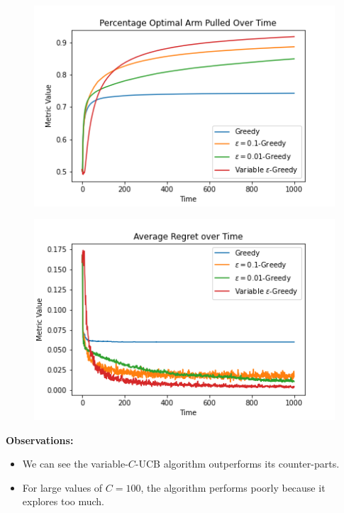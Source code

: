 \documentclass{article}
\begin{document}
		\begin{figure}[H]
		\graphicspath{ {../Experiments/Bernoulli_2_UCB/} }
		\centering
		\begin{minipage}{.5\textwidth}
		  \centering
		  \includegraphics[width=\linewidth]{Percentage_Optimal_Arm_Pulled_Over_Time.png}
		  \label{fig:test1}
		\end{minipage}%
		\begin{minipage}{.5\textwidth}
		  \centering
		  \includegraphics[width=\linewidth]{Average_Regret_over_Time.png}
		  \label{fig:test2}
		\end{minipage}
		\end{figure}
		
		\textbf{Observations:}
		\begin{itemize}
			\item We can see the variable-$C$-UCB algorithm outperforms its counter-parts.
			\item For large values of $C=100$, the algorithm performs poorly because it explores too much.
		\end{itemize}
		
\end{document}
